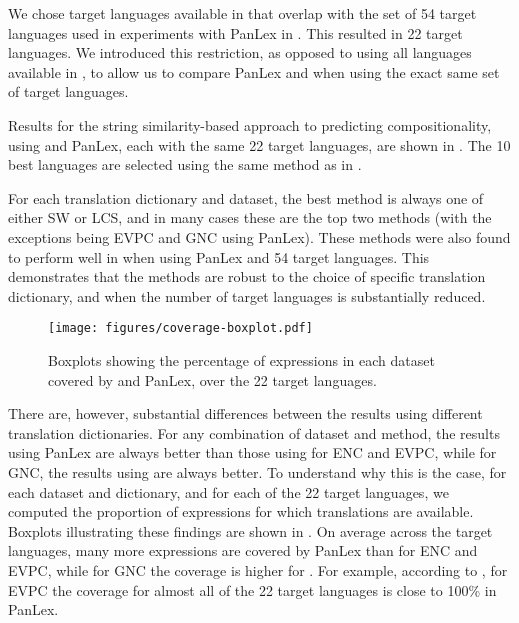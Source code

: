\documentclass[output=paper,modfonts,nonflat]{langsci/langscibook}
\begin{document}
We chose target languages available in \dictcc that overlap with the
set of 54 target languages used in experiments with PanLex in
. This resulted in 22 target
languages. We introduced this restriction, as opposed to using all
languages available in \dictcc, to allow us to compare PanLex and
\dictcc when using the exact same set of target languages.


Results for the string similarity-based approach to predicting
compositionality, using \dictcc and PanLex, each with the same 22
target languages, are shown in
. The 10 best languages are
selected using the same method as in .




For each translation dictionary and dataset, the best method is always
one of either SW or LCS, and in many cases these are the top two
methods (with the exceptions being EVPC and GNC using PanLex). These
methods were also found to perform well in 
when using PanLex and 54 target languages. This demonstrates that the 
methods are robust to the choice of specific translation dictionary,
and when the number of target languages is substantially reduced.

\begin{figure}[t]

  \texttt{[image: figures/coverage-boxplot.pdf]}
\caption{Boxplots showing the percentage of expressions in each
  dataset covered by \dictcc and PanLex, over the 22 target
  languages.\label{fig:ccdict:coverage}}

\end{figure}

There are, however, substantial differences between the results using
different translation dictionaries. For any combination of dataset and
method, the results using PanLex are always better than those using
\dictcc for ENC and EVPC, while for GNC, the results using \dictcc are
always better. To understand why this is the case, for each dataset 
and dictionary, and for each of the 22 target languages, we computed the 
proportion of expressions for which translations are
available. Boxplots illustrating these findings are shown in
. On average across the target languages,
many more expressions are covered by PanLex than \dictcc for ENC and
EVPC, while for GNC the coverage is higher for \dictcc. For example,
according to , for EVPC the coverage for
almost all of the 22 target languages is close to 100\% in PanLex.
\end{document}
